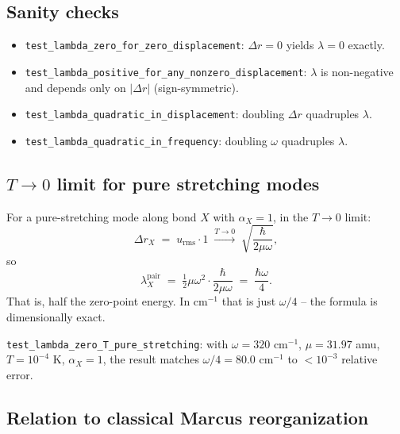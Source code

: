 \documentclass[10pt,a4paper,twoside]{article}
\newcommand{\urms}{u_{\mathrm{rms}}}
\newcommand{\fn}[1]{\texttt{#1}}
\begin{document}
\subsection{Sanity checks}

\begin{derivbox}
\begin{itemize}
  \item \fn{test\_lambda\_zero\_for\_zero\_displacement}: $\Delta r = 0$
        yields $\lambda = 0$ exactly.
  \item \fn{test\_lambda\_positive\_for\_any\_nonzero\_displacement}:
        $\lambda$ is non-negative and depends only on
        $|\Delta r|$ (sign-symmetric).
  \item \fn{test\_lambda\_quadratic\_in\_displacement}: doubling
        $\Delta r$ quadruples $\lambda$.
  \item \fn{test\_lambda\_quadratic\_in\_frequency}: doubling
        $\omega$ quadruples $\lambda$.
\end{itemize}
\end{derivbox}

\subsection{$T \to 0$ limit for pure stretching modes}

For a pure-stretching mode along bond $X$ with $\alpha_X = 1$, in
the $T \to 0$ limit:
\begin{equation}
  \Delta r_X
    \;=\;
  \urms \cdot 1
    \;\xrightarrow{T \to 0}\;
  \sqrt{\frac{\hbar}{2\mu\omega}},
\end{equation}
so
\begin{equation}
  \lambda_X^{\text{pair}}
    \;=\;
  \tfrac{1}{2}\mu\omega^2 \cdot \frac{\hbar}{2\mu\omega}
    \;=\;
  \frac{\hbar\omega}{4}.
  \label{eq:lambda-zero-T-derivation}
\end{equation}
That is, half the zero-point energy. In cm$^{-1}$ that is just
$\omega/4$ -- the formula is dimensionally exact.

\begin{derivbox}
\fn{test\_lambda\_zero\_T\_pure\_stretching}: with $\omega = 320$
cm$^{-1}$, $\mu = 31.97$ amu, $T = 10^{-4}$ K, $\alpha_X = 1$, the
result matches $\omega/4 = 80.0$ cm$^{-1}$ to $< 10^{-3}$
relative error.
\end{derivbox}

\subsection{Relation to classical Marcus reorganization}
\end{document}
